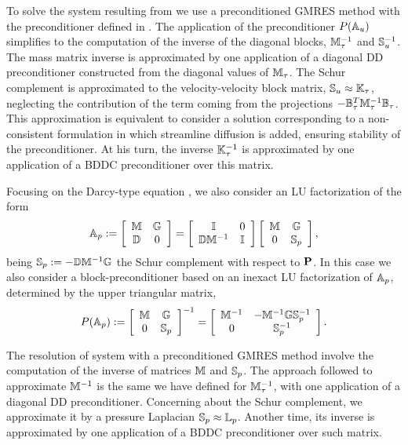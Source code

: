 To solve the system resulting from  we use a preconditioned GMRES method with the preconditioner defined in . The application of the preconditioner $ P(\A_u) $ simplifies to the computation of the inverse of the diagonal blocks, $ \M_\tau^{-1} $ and $ \Sb_u^{-1} $. The mass matrix inverse is approximated by one application of a diagonal DD preconditioner constructed from the diagonal values of $ \M_\tau $. The Schur complement is approximated to the velocity-velocity block matrix, $ \Sb_u\approx\K_\tau $, neglecting the contribution of the term coming from the projections $ -\B_\tau^T\M_\tau^{-1}\B_\tau $. This approximation is equivalent to consider a solution corresponding to a non-consistent formulation in which streamline diffusion is added, ensuring stability of the preconditioner. At his turn, the inverse $ \K_\tau^{-1} $ is approximated by one application of a BDDC preconditioner over this matrix.

Focusing on the Darcy-type equation , we also consider an LU factorization of the form
\begin{equation}
\label{SRK_p_mat}
\A_p:=\left[\begin{array}{cc}
\M&\G\\
\D&0
\end{array}\right]=\left[\begin{array}{cc}
\I&0\\
\D\M^{-1}&\I
\end{array}\right]\left[\begin{array}{cc}
\M&\G\\
0&\Sb_p
\end{array}\right],
\end{equation}
being $ \Sb_p:=-\D\M^{-1}\G$ the Schur complement with respect to $\P$. In this case we also consider a block-preconditioner based on an inexact LU factorization of $ \A_p $, determined by the upper triangular matrix,
\begin{equation}
\label{SRK_p_prec}
P(\A_p):=\left[\begin{array}{cc}
\M&\G\\
0&\Sb_p
\end{array}\right]^{-1}=\left[\begin{array}{cc}
\M^{-1}&-\M^{-1}\G\Sb_p^{-1}\\
0&\Sb_p^{-1}
\end{array}\right].
\end{equation}

The resolution of system  with a preconditioned GMRES method involve the computation of the inverse of matrices $ \M $ and $ \Sb_p $. The approach followed to approximate $ \M^{-1} $ is the same we have defined for $ \M_\tau^{-1} $, with one application of a diagonal DD preconditioner. Concerning about the Schur complement, we approximate it by a pressure Laplacian $ \Sb_p\approx\L_p $. Another time, its inverse is approximated by one application of a BDDC preconditioner over such matrix.

